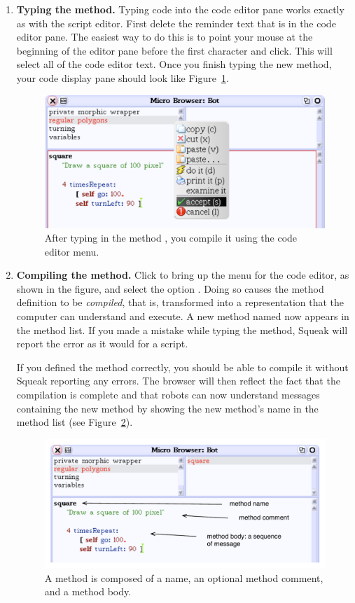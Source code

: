 \documentclass[a4paper,10pt,twoside]{book}
\begin{document}
\begin{enumerate}
	\item \textbf{Typing the method.} Typing code into the code editor pane works exactly as with the 
script editor. First delete the reminder text that is in the code editor pane. The easiest 
way to do this is to point your mouse at the beginning of the editor pane before the 
first character and click. This will select all of the code editor text. Once you finish 
typing the new method, your code display pane should look like Figure~\ref{fig:125}. 

\begin{figure}[ht]
	\centerline{\includegraphics[width=0.85\linewidth]{tbFive}}
	\caption{After typing in the method , you compile it using the code editor menu. \label{fig:125}}
\end{figure}


\item \textbf{Compiling the method.} Click to bring up the menu for the code editor, as shown in the 
figure, and select the option . Doing so causes the method definition to be \emph{compiled}, that is, transformed into a representation that the computer can understand and 
execute. A new method named  now appears in the method list. If you made a 
mistake while typing the method, Squeak will report the error as it would for a script. 

If you defined the method correctly, you should be able to compile it without Squeak 
reporting any errors. The browser will then reflect the fact that the compilation is complete and that robots can now understand messages containing the new method by 
showing the new method’s name in the method list (see Figure~\ref{fig:126}). 

\begin{figure}[ht]
	\centerline{\includegraphics[width=0.85\linewidth]{tbSixAnnotated}}
	\caption{A method is composed of a name, an optional method comment, and a method body. \label{fig:126}}
\end{figure}


\end{enumerate}
\end{document}
